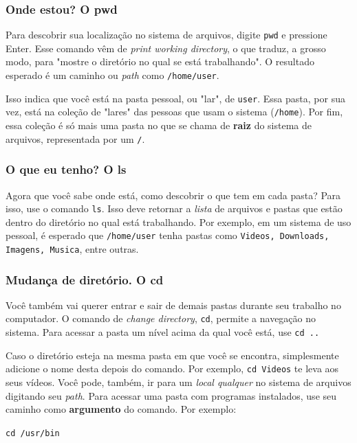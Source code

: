 \documentclass{article}
\begin{document}
	\subsubsection{Onde estou? O pwd}
	Para descobrir sua localização no sistema de arquivos, digite \texttt{pwd} e pressione Enter. Esse comando vêm de 
	\textit{print working directory}, o que traduz, a grosso modo, para "mostre o diretório no qual se está trabalhando". O
	resultado esperado é um caminho ou \textit{path} como \texttt{/home/user}. 

	Isso indica que você está na pasta pessoal, ou "lar", de \texttt{user}. Essa pasta, por sua vez, está 
	na coleção de "lares" das pessoas que usam o sistema (\texttt{/home}). Por fim, essa coleção é só mais uma pasta no que 
	se chama de \textbf{raiz} do sistema de arquivos, representada por um \texttt{/}. 

	\subsubsection{O que eu tenho? O ls} 

	Agora que você sabe onde está, como descobrir o que tem em cada pasta? Para isso, use o comando \texttt{ls}. Isso deve
	retornar a \textit{lista} de arquivos e pastas que estão dentro do diretório no qual está trabalhando. Por exemplo, em um sistema
	de uso pessoal, é esperado que \texttt{/home/user} tenha pastas como \texttt{Videos, Downloads, Imagens, Musica}, entre
	outras. 
	
	\subsubsection{Mudança de diretório. O cd} 

	Você também vai querer entrar e sair de demais pastas durante seu trabalho no computador. O comando de \textit{change
	directory}, \texttt{cd}, permite a navegação no sistema. Para acessar a pasta um nível acima da qual você está, use 
	\texttt{cd ..} 


	Caso o diretório esteja na mesma pasta em que você se encontra, simplesmente adicione o nome desta depois do comando. 
	Por exemplo, \texttt{cd Videos} te leva aos seus vídeos. Você pode, também, ir para um \textit{local qualquer} no sistema
	de arquivos digitando seu \textit{path}. Para acessar uma pasta com programas instalados, use seu caminho como 
	\textbf{argumento} do comando. Por exemplo: 
	
	\vspace{1ex}
	\texttt{cd /usr/bin} 
	\vspace{1ex}
\end{document}
